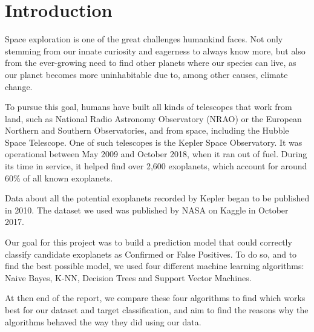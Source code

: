 
\section{Introduction}%
\label{sec:intro}
Space exploration is one of the great challenges humankind faces. Not only stemming
from our innate curiosity and eagerness to always know more, but also from the
ever-growing need to find other planets where our species can live, as our 
planet becomes more uninhabitable due to, among other causes, climate change.

To pursue this goal, humans have built all kinds of telescopes that work from
land, such as National Radio Astronomy Observatory (NRAO) or the European
Northern and Southern Observatories, and from space, including the Hubble
Space Telescope. One of such telescopes is the Kepler Space Observatory. It was operational between May 2009 and October 2018, when it ran out of fuel.
During its time in service, it helped find over 2,600 exoplanets, which account
for around 60\% of all known exoplanets.

Data about all the potential exoplanets recorded by Kepler began to be published
in 2010. The dataset we used was published by NASA on Kaggle in October 2017.

Our goal for this project was to build a prediction model that could correctly 
classify candidate exoplanets as Confirmed or False Positives. To do so,
and to find the best possible model, we used four different machine learning
algorithms: Naive Bayes, K-NN, Decision Trees and Support Vector Machines.

At then end of the report, we compare these four algorithms to find which
works best for our dataset and target classification, and aim to find the reasons
why the algorithms behaved the way they did using our data.